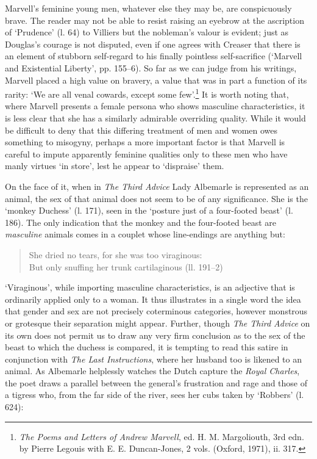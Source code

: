 ﻿\documentclass[12pt]{article}
\newcommand{\citedtitle}[1]{\textit{#1}}
\begin{document}
Marvell’s
feminine young men, whatever else they may be, are conspicuously brave. The
reader may not be able to resist raising an eyebrow at the ascription of
‘Prudence’ (l. 64) to Villiers but the nobleman’s valour is evident; just as
Douglas’s courage is not disputed, even if one agrees with Creaser that there
is an element of stubborn self-regard to his finally pointless self-sacrifice
(‘Marvell and Existential Liberty’, pp. 155–6). So far as we can judge from his
writings, Marvell placed a high value on bravery, a value that was in part a
function of its rarity: ‘We are all venal cowards, except some few’.\footnote{\citedtitle{The
Poems and Letters of Andrew Marvell}, ed. H. M. Margoliouth, 3rd edn. by Pierre Legouis with E. E. Duncan-Jones, 2 vols. (Oxford, 1971), ii. 317.} It is
worth noting that, where Marvell presents a female persona who shows masculine
characteristics, it is less clear that she has a similarly admirable overriding
quality.  While it would be difficult to deny that this differing treatment of
men and women owes something to misogyny, perhaps a more important factor is
that Marvell is careful to impute apparently feminine qualities only to these
men who have manly virtues ‘in store’, lest he appear to ‘dispraise’ them.

On
the face of it, when in \citedtitle{The Third Advice} Lady Albemarle is
represented as an animal, the sex of that animal does not seem to be of any
significance. She is the ‘monkey Duchess’ (l. 171), seen in the ‘posture just
of a four-footed beast’ (l. 186). The only indication that the monkey and the
four-footed beast are \emph{masculine} animals comes in a couplet whose
line-endings are anything but:

\begin{verse}
She dried no tears, for she was too viraginous:\\
But only snuffing her trunk cartilaginous (ll. 191–2)
\end{verse}
‘Viraginous’, while importing masculine characteristics, is an adjective that is ordinarily
applied only to a woman. It thus illustrates in a single word the idea that
gender and sex are not precisely coterminous categories, however monstrous or
grotesque their separation might appear. Further, though \citedtitle{The
Third Advice} on its own does not permit us to draw any very firm conclusion as to the sex of
the beast to which the duchess is compared, it is tempting to read this satire
in conjunction with \citedtitle{The Last Instructions}, where her husband too is likened
to an animal. As Albemarle helplessly watches the Dutch capture the \textit{Royal
Charles},
the poet draws a parallel between the general’s frustration and rage and those
of a tigress who, from the far side of the river, sees her cubs taken by
‘Robbers’ (l. 624):
\end{document}
